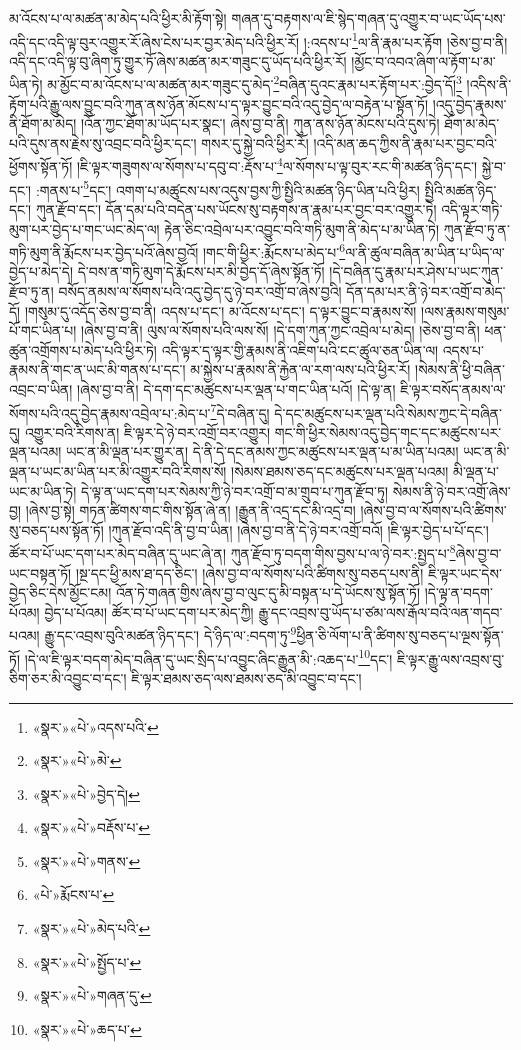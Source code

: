 མ་འོངས་པ་ལ་མཚན་མ་མེད་པའི་ཕྱིར་མི་རྟོག་སྟེ། གཞན་དུ་བརྟགས་ལ་ཇི་སྙེད་གཞན་དུ་འགྱུར་བ་ཡང་ཡོད་པས་འདི་དང་འདི་ལྟ་བུར་འགྱུར་རོ་ཞེས་ངེས་པར་བྱར་མེད་པའི་ཕྱིར་རོ། །:འདས་པ་\footnote{«སྣར་»«པེ་»འདས་པའི་}ལ་ནི་རྣམ་པར་རྟོག །ཅེས་བྱ་བ་ནི། འདི་དང་འདི་ལྟ་བུ་ཞིག་ཏུ་གྱུར་ཏོ་ཞེས་མཚན་མར་གཟུང་དུ་ཡོད་པའི་ཕྱིར་རོ། །མྱོང་བ་འབའ་ཞིག་ལ་རྟོག་པ་མ་ཡིན་ཏེ། མ་མྱོང་བ་མ་འོངས་པ་ལ་མཚན་མར་གཟུང་དུ་མེད་\footnote{«སྣར་»«པེ་»མེ་}བཞིན་དུའང་རྣམ་པར་རྟོག་པར་:བྱེད་དོ།\footnote{«སྣར་»«པེ་»བྱེད་དེ།} །འདིས་ནི་རྟོག་པའི་རྒྱུ་ལས་བྱུང་བའི་ཀུན་ནས་ཉོན་མོངས་པ་ད་ལྟར་བྱུང་བའི་འདུ་བྱེད་ལ་བརྟེན་པ་སྟོན་ཏོ། །འདུ་བྱེད་རྣམས་ནི་ཐོག་མ་མེད། །འོན་ཀྱང་ཐོག་མ་ཡོད་པར་སྣང་། ཞེས་བྱ་བ་ནི། ཀུན་ནས་ཉོན་མོངས་པའི་དུས་ཏེ། ཐོག་མ་མེད་པའི་དུས་ནས་རྗེས་སུ་འབྲང་བའི་ཕྱིར་དང་། གསར་དུ་སྐྱེ་བའི་ཕྱིར་རོ། །འདི་མན་ཆད་ཀྱིས་ནི་རྣམ་པར་བྱང་བའི་ཕྱོགས་སྟོན་ཏོ། །ཇི་ལྟར་གཟུགས་ལ་སོགས་པ་དབུ་བ་:རྡོས་པ་\footnote{«སྣར་»«པེ་»བརྡོས་པ་}ལ་སོགས་པ་ལྟ་བུར་རང་གི་མཚན་ཉིད་དང་། སྐྱེ་བ་དང་། :གནས་པ་\footnote{«སྣར་»«པེ་»གནས་}དང་། འགག་པ་མཚུངས་པས་འདུས་བྱས་ཀྱི་སྤྱིའི་མཚན་ཉིད་ཡིན་པའི་ཕྱིར། སྤྱིའི་མཚན་ཉིད་དང་། ཀུན་རྫོབ་དང་། དོན་དམ་པའི་བདེན་པས་ཡོངས་སུ་བརྟགས་ན་རྣམ་པར་བྱང་བར་འགྱུར་ཏེ། འདི་ལྟར་གཏི་མུག་པར་བྱེད་པ་གང་ཡང་མེད་ལ། རྟེན་ཅིང་འབྲེལ་པར་འབྱུང་བའི་གཏི་མུག་ནི་མེད་པ་མ་ཡིན་ཏེ། ཀུན་རྫོབ་ཏུ་ན་གཏི་མུག་ནི་རྨོངས་པར་བྱེད་པའོ་ཞེས་བྱའོ། །གང་གི་ཕྱིར་:རྨོངས་པ་མེད་པ་\footnote{«པེ་»རྨོངས་པ་}ལ་ནི་ཚུལ་བཞིན་མ་ཡིན་པ་ཡིད་ལ་བྱེད་པ་མེད་དེ། དེ་བས་ན་གཏི་མུག་དེ་རྨོངས་པར་མི་བྱེད་དོ་ཞེས་སྟོན་ཏོ། །དེ་བཞིན་དུ་རྣམ་པར་ཤེས་པ་ཡང་ཀུན་རྫོབ་ཏུ་ན། བསོད་ནམས་ལ་སོགས་པའི་འདུ་བྱེད་དུ་ཉེ་བར་འགྲོ་བ་ཞེས་བྱའི། དོན་དམ་པར་ནི་ཉེ་བར་འགྲོ་བ་མེད་དོ། །གསུམ་དུ་འདོད་ཅེས་བྱ་བ་ནི། འདས་པ་དང་། མ་འོངས་པ་དང་། ད་ལྟར་བྱུང་བ་རྣམས་སོ། །ལས་རྣམས་གསུམ་པོ་གང་ཡིན་པ། །ཞེས་བྱ་བ་ནི། ལུས་ལ་སོགས་པའི་ལས་སོ། །དེ་དག་ཀུན་ཀྱང་འབྲེལ་པ་མེད། །ཅེས་བྱ་བ་ནི། ཕན་ཚུན་འགྲོགས་པ་མེད་པའི་ཕྱིར་ཏེ། འདི་ལྟར་ད་ལྟར་གྱི་རྣམས་ནི་འཇིག་པའི་ངང་ཚུལ་ཅན་ཡིན་ལ། འདས་པ་རྣམས་ནི་གང་ན་ཡང་མི་གནས་པ་དང་། མ་སྐྱེས་པ་རྣམས་ནི་རྐྱེན་ལ་རག་ལས་པའི་ཕྱིར་རོ། །སེམས་ནི་ཕྱི་བཞིན་འབྲང་བ་ཡིན། །ཞེས་བྱ་བ་ནི། དེ་དག་དང་མཚུངས་པར་ལྡན་པ་གང་ཡིན་པའོ། །དེ་ལྟ་ན། ཇི་ལྟར་བསོད་ནམས་ལ་སོགས་པའི་འདུ་བྱེད་རྣམས་འབྲེལ་པ་:མེད་པ་\footnote{«སྣར་»«པེ་»མེད་པའི་}དེ་བཞིན་དུ། དེ་དང་མཚུངས་པར་ལྡན་པའི་སེམས་ཀྱང་དེ་བཞིན་དུ། འགྱུར་བའི་རིགས་ན། ཇི་ལྟར་དེ་ཉེ་བར་འགྲོ་བར་འགྱུར། གང་གི་ཕྱིར་སེམས་འདུ་བྱེད་གང་དང་མཚུངས་པར་ལྡན་པའམ། ཡང་ན་མི་ལྡན་པར་གྱུར་ན། དེ་ནི་དེ་དང་ནམས་ཀྱང་མཚུངས་པར་ལྡན་པ་མ་ཡིན་པའམ། ཡང་ན་མི་ལྡན་པ་ཡང་མ་ཡིན་པར་མི་འགྱུར་བའི་རིགས་སོ། །སེམས་ཐམས་ཅད་དང་མཚུངས་པར་ལྡན་པའམ། མི་ལྡན་པ་ཡང་མ་ཡིན་ཏེ། དེ་ལྟ་ན་ཡང་དག་པར་སེམས་ཀྱི་ཉེ་བར་འགྲོ་བ་མ་གྲུབ་པ་ཀུན་རྫོབ་ཏུ། སེམས་ནི་ཉེ་བར་འགྲོ་ཞེས་བྱ། །ཞེས་བྱ་སྟེ། གཏན་ཚིགས་གང་གིས་སྟོན་ཞེ་ན། །རྒྱུན་ནི་འདྲ་དང་མི་འདྲ་བ། །ཞེས་བྱ་བ་ལ་སོགས་པའི་ཚིགས་སུ་བཅད་པས་སྟོན་ཏོ། །ཀུན་རྫོབ་འདི་ནི་བྱ་བ་ཡིན། །ཞེས་བྱ་བ་ནི་དེ་ཉེ་བར་འགྲོ་བའོ། །ཇི་ལྟར་བྱེད་པ་པོ་དང་། ཚོར་བ་པོ་ཡང་དག་པར་མེད་བཞིན་དུ་ཡང་ཞེ་ན། ཀུན་རྫོབ་ཏུ་བདག་གིས་བྱས་པ་ལ་ཉེ་བར་:སྤྱད་པ་\footnote{«སྣར་»«པེ་»སྤྱོད་པ་}ཞེས་བྱ་བ་ཡང་བསྟན་ཏོ། །སྔ་དང་ཕྱི་མས་ཐ་དད་ཅིང་། །ཞེས་བྱ་བ་ལ་སོགས་པའི་ཚིགས་སུ་བཅད་པས་ནི། ཇི་ལྟར་ཡང་དེས་བྱེད་ཅིང་དེས་མྱོང་ངམ། འོན་ཏེ་གཞན་གྱིས་ཞེས་བྱ་བ་ལུང་དུ་མི་བསྟན་པ་དེ་ཡོངས་སུ་སྟོན་ཏོ། །དེ་ལྟ་ན་བདག་པོའམ། བྱེད་པ་པོའམ། ཚོར་བ་པོ་ཡང་དག་པར་མེད་ཀྱི། རྒྱུ་དང་འབྲས་བུ་ཡོད་པ་ཙམ་ལས་རྒོལ་བའི་ལན་གདབ་པའམ། རྒྱུ་དང་འབྲས་བུའི་མཚན་ཉིད་དང་། དེ་ཉིད་ལ་:བདག་ཏུ་\footnote{«སྣར་»«པེ་»གཞན་དུ་}ཕྱིན་ཅི་ལོག་པ་ནི་ཚིགས་སུ་བཅད་པ་ལྔས་སྟོན་ཏོ། །དེ་ལ་ཇི་ལྟར་བདག་མེད་བཞིན་དུ་ཡང་སྲིད་པ་འབྱུང་ཞིང་རྒྱུན་མི་:འཆད་པ་\footnote{«སྣར་»«པེ་»ཆད་པ་}དང་། ཇི་ལྟར་རྒྱུ་ལས་འབྲས་བུ་ཅིག་ཅར་མི་འབྱུང་བ་དང་། ཇི་ལྟར་ཐམས་ཅད་ལས་ཐམས་ཅད་མི་འབྱུང་བ་དང་། 